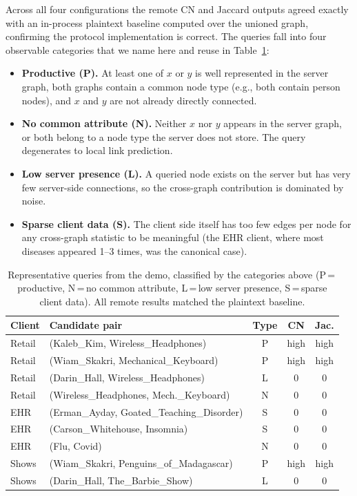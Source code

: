 \documentclass[sigconf]{acmart}
\begin{document}
Across all four configurations the remote CN and Jaccard outputs agreed exactly with an in-process plaintext baseline computed over the unioned graph, confirming the protocol implementation is correct. The queries fall into four observable categories that we name here and reuse in Table~\ref{tab:demo}:

\begin{itemize}
  \item \textbf{Productive (P).} At least one of $x$ or $y$ is well represented in the server graph, both graphs contain a common node type (e.g., both contain person nodes), and $x$ and $y$ are not already directly connected.
  \item \textbf{No common attribute (N).} Neither $x$ nor $y$ appears in the server graph, or both belong to a node type the server does not store. The query degenerates to local link prediction.
  \item \textbf{Low server presence (L).} A queried node exists on the server but has very few server-side connections, so the cross-graph contribution is dominated by noise.
  \item \textbf{Sparse client data (S).} The client side itself has too few edges per node for any cross-graph statistic to be meaningful (the EHR client, where most diseases appeared 1--3 times, was the canonical case).
\end{itemize}

\begin{table}[t]
  \centering
  \footnotesize
  \caption{Representative queries from the demo, classified by the categories above (P\,=\,productive, N\,=\,no common attribute, L\,=\,low server presence, S\,=\,sparse client data). All remote results matched the plaintext baseline.}
  \label{tab:demo}
  \setlength{\tabcolsep}{4pt}
  \begin{tabular}{@{}l l c c c@{}}
    \toprule
    Client & Candidate pair & Type & CN & Jac. \\
    \midrule
    Retail & (Kaleb\_Kim, Wireless\_Headphones)            & P & high  & high  \\
    Retail & (Wiam\_Skakri, Mechanical\_Keyboard)          & P & high  & high  \\
    Retail & (Darin\_Hall, Wireless\_Headphones)           & L & 0     & 0     \\
    Retail & (Wireless\_Headphones, Mech.\_Keyboard)       & N & 0     & 0     \\
    EHR    & (Erman\_Ayday, Goated\_Teaching\_Disorder)    & S & 0     & 0     \\
    EHR    & (Carson\_Whitehouse, Insomnia)                & S & 0     & 0     \\
    EHR    & (Flu, Covid)                                  & N & 0     & 0     \\
    Shows  & (Wiam\_Skakri, Penguins\_of\_Madagascar)      & P & high  & high  \\
    Shows  & (Darin\_Hall, The\_Barbie\_Show)              & L & 0     & 0     \\
    \bottomrule
  \end{tabular}
\end{table}
\end{document}
